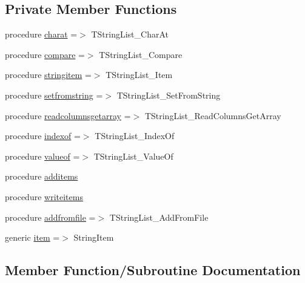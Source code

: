 \subsection*{Private Member Functions}
\begin{DoxyCompactItemize}
\item 
procedure \mbox{\hyperlink{structobjectlists_1_1tstringlist_a466c6ececd69d87edb8b7edea7ed386d}{charat}} =$>$ T\+String\+List\+\_\+\+Char\+At
\item 
procedure \mbox{\hyperlink{structobjectlists_1_1tstringlist_af43abdd2c8b81f985ffb01a5d2327431}{compare}} =$>$ T\+String\+List\+\_\+\+Compare
\item 
procedure \mbox{\hyperlink{structobjectlists_1_1tstringlist_a6c2fb2da4d2be980ad51952311b468e2}{stringitem}} =$>$ T\+String\+List\+\_\+\+Item
\item 
procedure \mbox{\hyperlink{structobjectlists_1_1tstringlist_a7b6e0cfa664dedb22868535435aa6911}{setfromstring}} =$>$ T\+String\+List\+\_\+\+Set\+From\+String
\item 
procedure \mbox{\hyperlink{structobjectlists_1_1tstringlist_a8519c2d33e5d7af756bb13554ba60011}{readcolumnsgetarray}} =$>$ T\+String\+List\+\_\+\+Read\+Columns\+Get\+Array
\item 
procedure \mbox{\hyperlink{structobjectlists_1_1tstringlist_add340bd445c31e2449c4824eb483e707}{indexof}} =$>$ T\+String\+List\+\_\+\+Index\+Of
\item 
procedure \mbox{\hyperlink{structobjectlists_1_1tstringlist_a8443cbafa759bbc2d8e2039088a5f46f}{valueof}} =$>$ T\+String\+List\+\_\+\+Value\+Of
\item 
procedure \mbox{\hyperlink{structobjectlists_1_1tstringlist_af5bd4c75f193d5f93c46ec69885d46f8}{additems}}
\item 
procedure \mbox{\hyperlink{structobjectlists_1_1tstringlist_aac7a4ed96ee23bc9227586f53817d404}{writeitems}}
\item 
procedure \mbox{\hyperlink{structobjectlists_1_1tstringlist_a13486e7dc3ca26cd20a5b4f4af4c6663}{addfromfile}} =$>$ T\+String\+List\+\_\+\+Add\+From\+File
\item 
generic \mbox{\hyperlink{structobjectlists_1_1tstringlist_a79a38c10317359516b100e5f478fda9d}{item}} =$>$ String\+Item
\end{DoxyCompactItemize}


\subsection{Member Function/\+Subroutine Documentation}
\mbox{\label{structobjectlists_1_1tstringlist_a13486e7dc3ca26cd20a5b4f4af4c6663}} 
